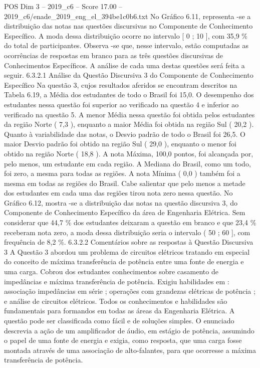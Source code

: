 \begin{textsample}{POS Dim 3 – 2019\_c6 – Score 17.00 – 2019\_c6/enade\_2019\_eng\_el\_394be1c0b6.txt}
No Gráfico 6.11, representa -se a distribuição das notas nas questões discursivas no Componente de Conhecimento Específico.
A moda dessa distribuição ocorre no intervalo [ 0 ; 10 ], com 35,9 \% do total de participantes.
Observa -se que, nesse intervalo, estão computadas as ocorrências de respostas em branco para as três questões discursivas de Conhecimentos Específicos.
A análise de cada uma destas questões será feita a seguir. 6.3.2.1 Análise da Questão Discursiva 3 do Componente de Conhecimento Específico Na questão 3, cujos resultados aferidos se encontram descritos na Tabela 6.19, a Média dos estudantes de todo o Brasil foi 15,0.
O desempenho dos estudantes nessa questão foi superior ao verificado na questão 4 e inferior ao verificado na questão 5.
A menor Média nessa questão foi obtida pelos estudantes da região Norte ( 7,3 ), enquanto a maior Média foi obtida na região Sul ( 20,2 ).
Quanto à variabilidade das notas, o Desvio padrão de todo o Brasil foi 26,5.
O maior Desvio padrão foi obtido na região Sul ( 29,0 ), enquanto o menor foi obtido na região Norte ( 18,8 ).
A nota Máxima, 100,0 pontos, foi alcançada por, pelo menos, um estudante em cada região.
A Mediana do Brasil, como um todo, foi zero, a mesma para todas as regiões.
A nota Mínima ( 0,0 ) também foi a mesma em todas as regiões do Brasil.
Cabe salientar que pelo menos a metade dos estudantes em cada uma das regiões tirou nota zero nessa questão.
No Gráfico 6.12, mostra -se a distribuição das notas na questão discursiva 3, do Componente de Conhecimento Específico da área de Engenharia Elétrica.
Sem considerar que 44,7 \% dos estudantes deixaram a questão em branco e que 23,4 \% receberam nota zero, a moda dessa distribuição seria o intervalo ( 50 ; 60 ], com frequência de 8,2 \%. 6.3.2.2 Comentários sobre as respostas à Questão Discursiva 3 A Questão 3 abordou um problema de circuitos elétricos tratando em especial do conceito de máxima transferência de potência entre uma fonte de energia e uma carga.
Cobrou dos estudantes conhecimentos sobre casamento de impedâncias e máxima transferência de potência.
Exigiu habilidades em : associação impedâncias em série ; operações com grandezas elétricas de potência ; e análise de circuitos elétricos.
Todos os conhecimentos e habilidades são fundamentais para formandos em todas as áreas da Engenharia Elétrica.
A questão pode ser classificada como fácil e de soluções simples.
O enunciado descrevia a ação de um amplificador de áudio, em estágio de potência, assumindo o papel de uma fonte de energia e exigia, como resposta, que uma carga fosse montada através de uma associação de alto-falantes, para que ocorresse a máxima transferência de potência.

\end{textsample}
